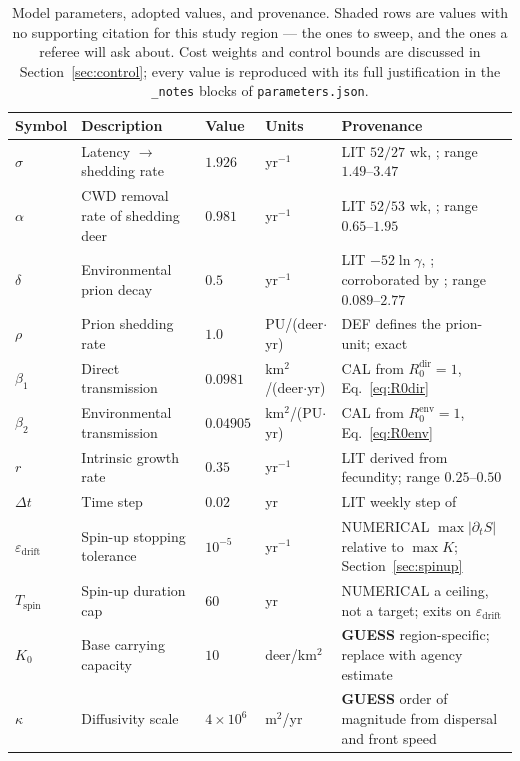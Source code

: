 \documentclass[11pt]{article}
\newcommand{\tagLIT}{{\footnotesize\textsf{\textcolor{green!40!black}{LIT}}}}
\newcommand{\tagDEF}{{\footnotesize\textsf{\textcolor{blue!60!black}{DEF}}}}
\newcommand{\tagCAL}{{\footnotesize\textsf{\textcolor{orange!75!black}{CAL}}}}
\newcommand{\tagGUESS}{{\footnotesize\textsf{\textbf{\textcolor{red!70!black}{GUESS}}}}}
\newcommand{\tagNUM}{{\footnotesize\textsf{\textcolor{purple!70!black}{NUMERICAL}}}}
\newcommand{\guessrow}{\rowcolor{guessbg}}
\begin{document}
\begin{table}[h]
\centering
\small
\caption{Model parameters, adopted values, and provenance. Shaded rows are values with no supporting citation for this study region --- the ones to sweep, and the ones a referee will ask about. Cost weights and control bounds are discussed in Section~\ref{sec:control}; every value is reproduced with its full justification in the \texttt{\_notes} blocks of \texttt{parameters.json}.}
\label{tab:paramvalues}
\begin{tabular}{@{}llllp{4.6cm}@{}}
\toprule
Symbol & Description & Value & Units & Provenance \\
\midrule
$\sigma$ & Latency $\to$ shedding rate & $1.926$ & yr$^{-1}$ & \tagLIT{} $52/27$ wk, \citet{Almberg2011}; range $1.49$--$3.47$ \\
$\alpha$ & CWD removal rate of shedding deer & $0.981$ & yr$^{-1}$ & \tagLIT{} $52/53$ wk, \citet{Almberg2011}; range $0.65$--$1.95$ \\
$\delta$ & Environmental prion decay & $0.5$ & yr$^{-1}$ & \tagLIT{} $-52\ln\gamma$, \citet{Almberg2011}; corroborated by \citet{Miller2004}; range $0.089$--$2.77$ \\
$\rho$ & Prion shedding rate & $1.0$ & PU/(deer$\cdot$yr) & \tagDEF{} defines the prion-unit; exact \\
$\beta_1$ & Direct transmission & $0.0981$ & km$^2$/(deer$\cdot$yr) & \tagCAL{} from $R_0^{\mathrm{dir}}=1$, Eq.~\eqref{eq:R0dir} \\
$\beta_2$ & Environmental transmission & $0.04905$ & km$^2$/(PU$\cdot$yr) & \tagCAL{} from $R_0^{\mathrm{env}}=1$, Eq.~\eqref{eq:R0env} \\
$r$ & Intrinsic growth rate & $0.35$ & yr$^{-1}$ & \tagLIT{} derived from \citet{Almberg2011} fecundity; range $0.25$--$0.50$ \\
$\Delta t$ & Time step & $0.02$ & yr & \tagLIT{} weekly step of \citet{Almberg2011} \\
$\varepsilon_{\text{drift}}$ & Spin-up stopping tolerance & $10^{-5}$ & yr$^{-1}$ & \tagNUM{} $\max|\partial_t S|$ relative to $\max K$; Section~\ref{sec:spinup} \\
$T_{\text{spin}}$ & Spin-up duration cap & $60$ & yr & \tagNUM{} a ceiling, not a target; exits on $\varepsilon_{\text{drift}}$ \\
\guessrow $K_0$ & Base carrying capacity & $10$ & deer/km$^2$ & \tagGUESS{} region-specific; replace with agency estimate \\
\guessrow $\kappa$ & Diffusivity scale & $4\times10^{6}$ & m$^2$/yr & \tagGUESS{} order of magnitude from dispersal and front speed \\

\end{tabular}
\end{table}
\end{document}
